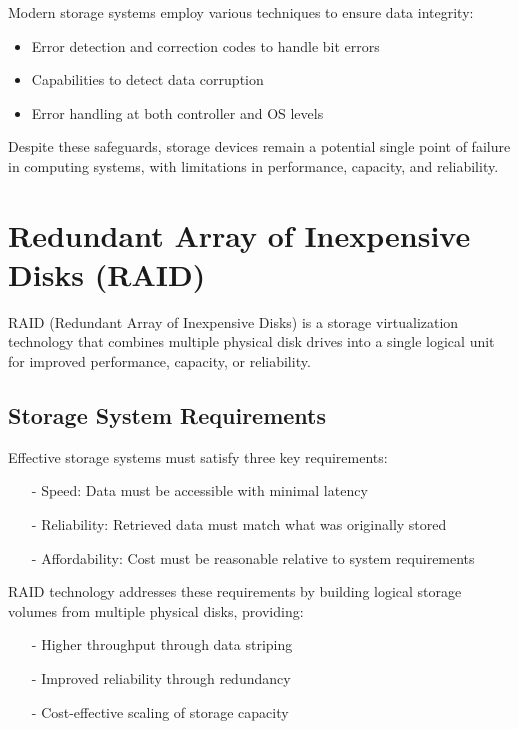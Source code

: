 \documentclass[../../compsys.tex]{subfiles}
\begin{document}
Modern storage systems employ various techniques to ensure data integrity:
\begin{itemize}
    \item Error detection and correction codes to handle bit errors
    \item Capabilities to detect data corruption
    \item Error handling at both controller and OS levels
\end{itemize}

Despite these safeguards, storage devices remain a potential single point of failure in computing systems, with limitations in performance, capacity, and reliability.
\newpage
\section{Redundant Array of Inexpensive Disks (RAID)}

\begin{definition}
RAID (Redundant Array of Inexpensive Disks) is a storage virtualization technology that combines multiple physical disk drives into a single logical unit for improved performance, capacity, or reliability.
\end{definition}

\subsection{Storage System Requirements}

Effective storage systems must satisfy three key requirements:
\begin{itemize}
    \item[-] Speed: Data must be accessible with minimal latency
    \item[-] Reliability: Retrieved data must match what was originally stored
    \item[-] Affordability: Cost must be reasonable relative to system requirements
\end{itemize}

RAID technology addresses these requirements by building logical storage volumes from multiple physical disks, providing:
\begin{itemize}
    \item[-] Higher throughput through data striping
    \item[-] Improved reliability through redundancy
    \item[-] Cost-effective scaling of storage capacity
\end{itemize}
\end{document}
